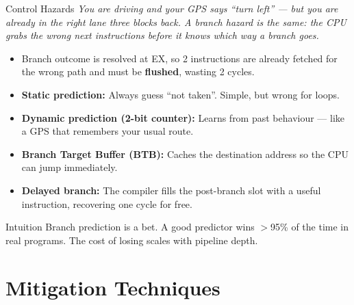 \documentclass{beamer}
\begin{document}
\begin{frame}{Control Hazards}
  \textit{You are driving and your GPS says ``turn left'' --- but you are
  already in the right lane three blocks back. A branch hazard is the same:
  the CPU grabs the wrong next instructions before it knows which way a
  branch goes.}

  \smallskip
  \begin{itemize}
    \item Branch outcome is resolved at EX, so 2 instructions are already
          fetched for the wrong path and must be \textbf{flushed}, wasting
          2 cycles.
    \item \textbf{Static prediction:} Always guess ``not taken''. Simple,
          but wrong for loops.
    \item \textbf{Dynamic prediction (2-bit counter):} Learns from past
          behaviour --- like a GPS that remembers your usual route.
    \item \textbf{Branch Target Buffer (BTB):} Caches the destination address
          so the CPU can jump immediately.
    \item \textbf{Delayed branch:} The compiler fills the post-branch slot
          with a useful instruction, recovering one cycle for free.
  \end{itemize}

  \begin{block}{Intuition}
    \small Branch prediction is a bet. A good predictor wins $>$95\% of the
    time in real programs. The cost of losing scales with pipeline depth.
  \end{block}
\end{frame}

\section{Mitigation Techniques}
\end{document}

